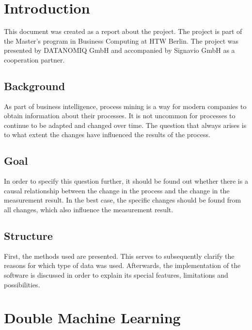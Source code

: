 \chapter{Introduction}
    This document was created as a report about the project. The project is part of the Master's program in Business Computing at HTW Berlin. The project was presented by DATANOMIQ GmbH and accompanied by Signavio GmbH as a cooperation partner.

    \section{Background}
    As part of business intelligence, process mining is a way for modern companies to obtain information about their processes. It is not uncommon for processes to continue to be adapted and changed over time. The question that always arises is to what extent the changes have influenced the results of the process.

    \section{Goal}
    In order to specify this question further, it should be found out whether there is a causal relationship between the change in the process and the change in the measurement result. In the best case, the specific changes should be found from all changes, which also influence the measurement result.

    \section{Structure}
    First, the methods used are presented. This serves to subsequently clarify the reasons for which type of data was used. Afterwards, the implementation of the software is discussed in order to explain its special features, limitations and possibilities.

\clearpage
\chapter{Double Machine Learning}

